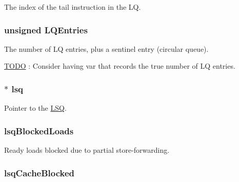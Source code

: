 \label{classLSQUnit_a973a489225da164cc85e690f13c86841}
The index of the tail instruction in the LQ. \hypertarget{classLSQUnit_aafa99d800d574095881acbacdbbbcc47}{
\subsubsection[{LQEntries}]{\setlength{\rightskip}{0pt plus 5cm}unsigned {\bf LQEntries}}}
\label{classLSQUnit_aafa99d800d574095881acbacdbbbcc47}
The number of LQ entries, plus a sentinel entry (circular queue). \begin{Desc}
\item[\hyperlink{todo__todo000036}{TODO}]: Consider having var that records the true number of LQ entries. \end{Desc}
\hypertarget{classLSQUnit_ac0894e8141823f8eea2c9041bac9dab4}{
\subsubsection[{lsq}]{$\ast$ {\bf lsq}}}
\label{classLSQUnit_ac0894e8141823f8eea2c9041bac9dab4}
Pointer to the \hyperlink{classLSQ}{LSQ}. \hypertarget{classLSQUnit_a5323f1c2b6bf5cccc59253596656eb70}{
\subsubsection[{lsqBlockedLoads}]{ {\bf lsqBlockedLoads}}}
\label{classLSQUnit_a5323f1c2b6bf5cccc59253596656eb70}
Ready loads blocked due to partial store-\/forwarding. \hypertarget{classLSQUnit_a33a1cca2455a3e5909f462a778902643}{
\subsubsection[{lsqCacheBlocked}]{ {\bf lsqCacheBlocked}}}
